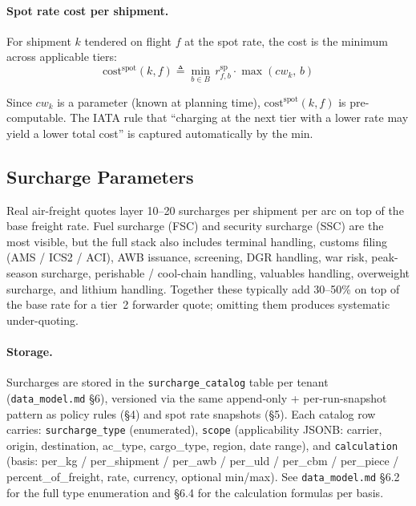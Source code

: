 \documentclass[11pt,a4paper]{article}
\newcommand{\defeq}{\triangleq}
\theoremstyle{definition}
\begin{document}
\paragraph{Spot rate cost per shipment.}
For shipment $k$ tendered on flight $f$ at the spot rate, the cost is the minimum across
applicable tiers:
\begin{equation}
  \text{cost}^{\text{spot}}(k, f) \defeq \min_{b \in B}\, r^{\text{sp}}_{f,b} \cdot \max(cw_k,\, b)
  \label{eq:spot-cost}
\end{equation}

Since $cw_k$ is a parameter (known at planning time), $\text{cost}^{\text{spot}}(k, f)$ is
pre-computable. The IATA rule that ``charging at the next tier with a lower rate may yield a
lower total cost'' is captured automatically by the min.

\subsection{Surcharge Parameters}
\label{sec:surcharge}

Real air-freight quotes layer 10--20 surcharges per shipment per arc on top of the base
freight rate. Fuel surcharge (FSC) and security surcharge (SSC) are the most visible,
but the full stack also includes terminal handling, customs filing (AMS / ICS2 / ACI),
AWB issuance, screening, DGR handling, war risk, peak-season surcharge, perishable /
cool-chain handling, valuables handling, overweight surcharge, and lithium handling.
Together these typically add 30--50\% on top of the base rate for a tier~2 forwarder
quote; omitting them produces systematic under-quoting.

\paragraph{Storage.}
Surcharges are stored in the \texttt{surcharge\_catalog} table per tenant
(\texttt{data\_model.md} \S6), versioned via the same append-only + per-run-snapshot
pattern as policy rules (\S4) and spot rate snapshots (\S5). Each catalog row carries:
\texttt{surcharge\_type} (enumerated), \texttt{scope} (applicability JSONB:
carrier, origin, destination, ac\_type, cargo\_type, region, date range), and
\texttt{calculation} (basis: per\_kg / per\_shipment / per\_awb / per\_uld / per\_cbm /
per\_piece / percent\_of\_freight, rate, currency, optional min/max).
See \texttt{data\_model.md} \S6.2 for the full type enumeration and \S6.4 for the
calculation formulas per basis.
\end{document}
